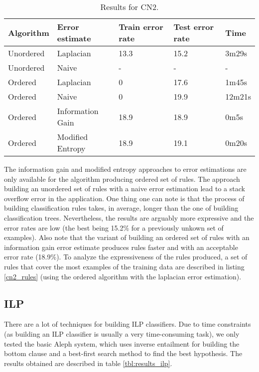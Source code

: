 \documentclass[a4paper]{llncs}
\begin{document}
\begin{table}
\begin{center}
\begin{tabular}{ | l | l | l | l | l |}
    \hline
    \textbf{Algorithm} & \textbf{Error estimate} & \textbf{Train error rate} & \textbf{Test error rate} & \textbf{Time} \\ \hline
    Unordered & Laplacian & 13.3 & 15.2 & 3m29s \\ \hline
    Unordered & Naive & - & - & - \\ \hline
    Ordered & Laplacian & 0 & 17.6 & 1m45s \\ \hline
    Ordered & Naive & 0 & 19.9 & 12m21s \\ \hline
    Ordered & Information Gain & 18.9 & 18.9 & 0m5s \\ \hline
    Ordered & Modified Entropy & 18.9 & 19.1 & 0m20s \\ \hline
\end{tabular}
\caption{Results for CN2.}
\label{tbl:results_cn2}
\end{center}
\end{table}

The information gain and modified entropy approaches to error estimations are
only available for the algorithm producing ordered set of rules. The approach
building an unordered set of rules with a naive error estimation lead to a stack
overflow error in the application. One thing one can note is that the process of
building classification rules takes, in average, longer than the one of building
classification trees. Nevertheless, the results are arguably more expressive and
the error rates are low (the best being 15.2\% for a previously unkown set of 
examples). Also note that the variant of building an ordered set of rules with
an information gain error estimate produces rules faster and with an acceptable
error rate (18.9\%). To analyze the expressiveness of the rules produced, a set
of rules that cover the most examples of the training data are described in 
listing \ref{cn2_rules} (using the ordered algorithm with the laplacian error 
estimation).

\subsection{ILP}

There are a lot of techniques for building ILP classifiers. Due to time
constraints (as building an ILP classifier is usually a very time-consuming 
task), we only tested the basic Aleph system, which uses inverse entailment for
building the bottom clause and a best-first search method to find the best
hypothesis. The results obtained are described in table \ref{tbl:results_ilp}.
\end{document}
